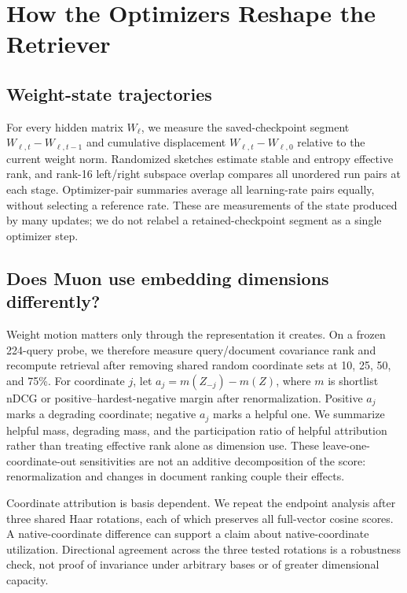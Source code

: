 \documentclass[11pt]{article}
\begin{document}
\CorrectedMainSection

\section{How the Optimizers Reshape the Retriever}

\subsection{Weight-state trajectories}

For every hidden matrix $W_\ell$, we measure the saved-checkpoint segment
$W_{\ell,t}-W_{\ell,t-1}$ and cumulative displacement $W_{\ell,t}-W_{\ell,0}$ relative to the
current weight norm. Randomized sketches estimate stable and entropy effective rank, and rank-16
left/right subspace overlap compares all unordered run pairs at each stage. Optimizer-pair summaries
average all learning-rate pairs equally, without selecting a reference rate. These
are measurements of the state produced by many updates; we do not relabel a retained-checkpoint
segment as a single optimizer step.

\CorrectedWeightSpaceFinding

\subsection{Does Muon use embedding dimensions differently?}

Weight motion matters only through the representation it creates. On a frozen 224-query probe, we
therefore measure query/document covariance rank and recompute retrieval after removing shared
random coordinate sets at 10, 25, 50, and 75\%. For coordinate $j$, let
$a_j=m(Z_{-j})-m(Z)$, where $m$ is shortlist nDCG or positive--hardest-negative margin after
renormalization. Positive $a_j$ marks a degrading coordinate; negative $a_j$ marks a helpful one.
We summarize helpful mass, degrading mass, and the participation ratio of helpful attribution rather
than treating effective rank alone as dimension use. These leave-one-coordinate-out sensitivities
are not an additive decomposition of the score: renormalization and changes in document ranking
couple their effects.

Coordinate attribution is basis dependent. We repeat the endpoint analysis after three shared Haar
rotations, each of which preserves all full-vector cosine scores. A native-coordinate difference can
support a claim about native-coordinate utilization. Directional agreement across the three tested
rotations is a robustness check, not proof of invariance under arbitrary bases or of greater
dimensional capacity.
\end{document}
